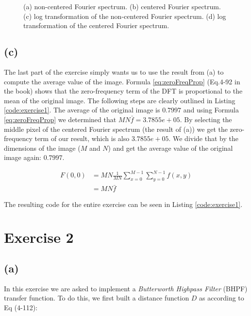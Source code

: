 \documentclass{article}
\begin{document}
\begin{figure}[h]
    \centering
    
    \caption{(a) non-centered Fourier spectrum. (b) centered Fourier spectrum. (c) log transformation of the non-centered Fourier spectrum. (d) log transformation of the centered Fourier spectrum.}
    \label{fig:exercise1}
\end{figure}

\subsection*{(c)}
The last part of the exercise simply wants us to use the result from (a) to compute the average value of the image. Formula \ref{eq:zeroFreqProp} (Eq.4-92 in the book) shows that the zero-frequency term of the DFT is proportional to the mean of the original image. The following steps are clearly outlined in  Listing \ref{code:exercise1}. The average of the original image is $0.7997$ and using Formula \ref{eq:zeroFreqProp} we determined that $M N \bar{f} = 3.7855e+05$. By selecting the middle pixel of the centered Fourier spectrum (the result of (a)) we get the zero-frequency term of our result, which is also $3.7855e+05$. We divide that by the dimensions of the image ($M$ and $N$) and get the average value of the original image again: $0.7997$.

\begin{equation}\label{eq:zeroFreqProp}
    \begin{aligned}
    F(0,0) &=M N \frac{1}{M N} \sum_{x=0}^{M-1} \sum_{y=0}^{N-1} f(x, y) \\
    &=M N \bar{f}
    \end{aligned}
\end{equation}

The resulting code for the entire exercise can be seen in  Listing \ref{code:exercise1}.

\newpage
\section*{Exercise 2}
\subsection*{(a)} In this exercise we are asked to implement a \textit{Butterworth Highpass Filter} (BHPF) transfer function. To do this, we first built a distance function $D$ as according to Eq (4-112):
\end{document}
